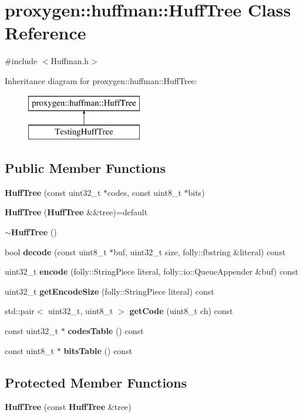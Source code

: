 \section{proxygen\+:\+:huffman\+:\+:Huff\+Tree Class Reference}
\label{classproxygen_1_1huffman_1_1HuffTree}


{\ttfamily \#include $<$Huffman.\+h$>$}

Inheritance diagram for proxygen\+:\+:huffman\+:\+:Huff\+Tree\+:\begin{figure}[H]
\begin{center}
\leavevmode
\includegraphics[height=2.000000cm]{classproxygen_1_1huffman_1_1HuffTree}
\end{center}
\end{figure}
\subsection*{Public Member Functions}
\begin{DoxyCompactItemize}
\item 
{\bf Huff\+Tree} (const uint32\+\_\+t $\ast$codes, const uint8\+\_\+t $\ast$bits)
\item 
{\bf Huff\+Tree} ({\bf Huff\+Tree} \&\&tree)=default
\item 
{\bf $\sim$\+Huff\+Tree} ()
\item 
bool {\bf decode} (const uint8\+\_\+t $\ast$buf, uint32\+\_\+t size, folly\+::fbstring \&literal) const 
\item 
uint32\+\_\+t {\bf encode} (folly\+::\+String\+Piece literal, folly\+::io\+::\+Queue\+Appender \&buf) const 
\item 
uint32\+\_\+t {\bf get\+Encode\+Size} (folly\+::\+String\+Piece literal) const 
\item 
std\+::pair$<$ uint32\+\_\+t, uint8\+\_\+t $>$ {\bf get\+Code} (uint8\+\_\+t ch) const 
\item 
const uint32\+\_\+t $\ast$ {\bf codes\+Table} () const 
\item 
const uint8\+\_\+t $\ast$ {\bf bits\+Table} () const 
\end{DoxyCompactItemize}
\subsection*{Protected Member Functions}
\begin{DoxyCompactItemize}
\item 
{\bf Huff\+Tree} (const {\bf Huff\+Tree} \&tree)
\end{DoxyCompactItemize}
